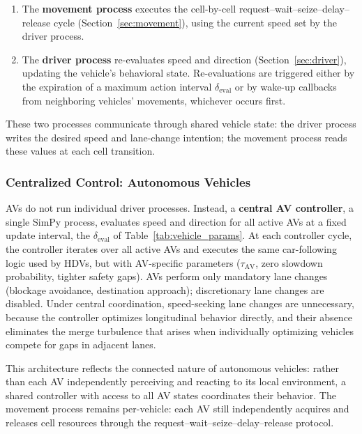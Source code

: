 \documentclass[review,authoryear]{elsarticle}
\begin{document}
\begin{enumerate}
    \item The \textbf{movement process} executes the cell-by-cell request--wait--seize--delay--release cycle (Section~\ref{sec:movement}), using the current speed set by the driver process.

    \item The \textbf{driver process} re-evaluates speed and direction (Section~\ref{sec:driver}), updating the vehicle's behavioral state. Re-evaluations are triggered either by the expiration of a maximum action interval $\delta_{\text{eval}}$ or by wake-up callbacks from neighboring vehicles' movements, whichever occurs first.
\end{enumerate}

These two processes communicate through shared vehicle state: the driver process writes the desired speed and lane-change intention; the movement process reads these values at each cell transition.

\subsubsection{Centralized Control: Autonomous Vehicles}
\label{sec:av_controller}

AVs do not run individual driver processes. Instead, a \textbf{central AV controller}, a single SimPy process, evaluates speed and direction for all active AVs at a fixed update interval, the $\delta_{\text{eval}}$ of Table~\ref{tab:vehicle_params}. At each controller cycle, the controller iterates over all active AVs and executes the same car-following logic used by HDVs, but with AV-specific parameters ($\tau_{\text{AV}}$, zero slowdown probability, tighter safety gaps). AVs perform only mandatory lane changes (blockage avoidance, destination approach); discretionary lane changes are disabled. Under central coordination, speed-seeking lane changes are unnecessary, because the controller optimizes longitudinal behavior directly, and their absence eliminates the merge turbulence that arises when individually optimizing vehicles compete for gaps in adjacent lanes.

This architecture reflects the connected nature of autonomous vehicles: rather than each AV independently perceiving and reacting to its local environment, a shared controller with access to all AV states coordinates their behavior. The movement process remains per-vehicle: each AV still independently acquires and releases cell resources through the request--wait--seize--delay--release protocol.
\end{document}
